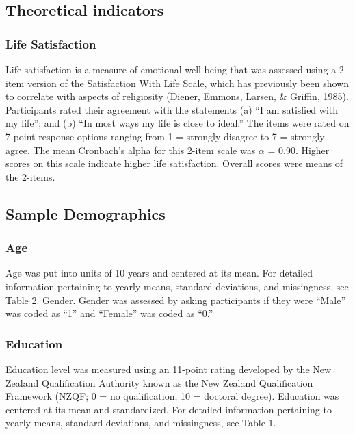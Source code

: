 \documentclass[
  english,
  man,floatsintext]{apa6}
\begin{document}
\hypertarget{theoretical-indicators}{%
\subsection{Theoretical indicators}\label{theoretical-indicators}}

\hypertarget{life-satisfaction}{%
\subsubsection{Life Satisfaction}\label{life-satisfaction}}

Life satisfaction is a measure of emotional well-being that was assessed using a 2-item version of the Satisfaction With Life Scale, which has previously been shown to correlate with aspects of religiosity (Diener, Emmons, Larsen, \& Griffin, 1985). Participants rated their agreement with the statements (a) \enquote{I am satisfied with my life}; and (b) \enquote{In most ways my life is close to ideal.} The items were rated on 7-point response options ranging from 1 = strongly disagree to 7 = strongly agree. The mean Cronbach's alpha for this 2-item scale was \(\alpha\) = 0.90. Higher scores on this scale indicate higher life satisfaction. Overall scores were means of the 2-items.

\hypertarget{sample-demographics}{%
\subsection{Sample Demographics}\label{sample-demographics}}

\hypertarget{age}{%
\subsubsection{Age}\label{age}}

Age was put into units of 10 years and centered at its mean. For detailed information pertaining to yearly means, standard deviations, and missingness, see Table 2.
Gender. Gender was assessed by asking participants if they were \enquote{Male} was coded as \enquote{1} and \enquote{Female} was coded as \enquote{0.}

\hypertarget{education}{%
\subsubsection{Education}\label{education}}

Education level was measured using an 11-point rating developed by the New Zealand Qualification Authority known as the New Zealand Qualification Framework (NZQF; 0 = no qualification, 10 = doctoral degree). Education was centered at its mean and standardized. For detailed information pertaining to yearly means, standard deviations, and missingness, see Table 1.
\end{document}
